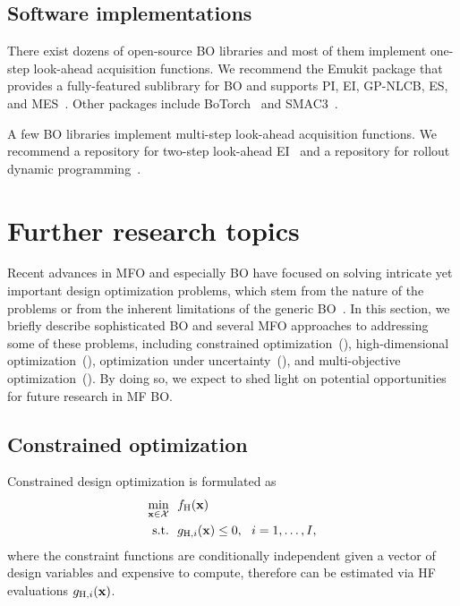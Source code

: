 \documentclass[iicol,sn-basic]{sn-jnl}%
\begin{document}
\subsection{Software implementations}\label{Sec55}

There exist dozens of open-source BO libraries and most of them implement one-step look-ahead acquisition functions.
We recommend the Emukit package that provides a fully-featured sublibrary for BO and supports PI, EI, GP-NLCB, ES, and MES~\citep{Paleyes2019}.
Other packages include BoTorch~\citep{Balandat2020} and SMAC3~\citep{Lindauer2022}.

A few BO libraries implement multi-step look-ahead acquisition functions. 
We recommend a repository for two-step look-ahead EI~\citep{WuJ2019} and a repository for rollout dynamic programming~\citep{Lee2020}.

\section{Further research topics}\label{Sec6}

Recent advances in MFO and especially BO have focused on solving intricate yet important design optimization problems, which stem from the nature of the problems or from the inherent limitations of the generic BO~\citep{Wang2023}.  
In this section, we briefly describe sophisticated BO and several MFO approaches to addressing some of these problems, including constrained optimization~(), high-dimensional optimization~(), optimization under uncertainty~(), and multi-objective optimization~().
By doing so, we expect to shed light on potential opportunities for future research in MF BO.

\subsection{Constrained optimization}\label{Sec61}

Constrained design optimization is formulated as
\begin{equation}\label{Eq61}
	\begin{aligned}
		\underset{{\bf x} \in \mathcal{X}}{\min} \ \ & f_\text{H}(\bf x)\\
		\textrm{s.t.} \ \ 
		& g_{\text{H},i}({\bf x}) \leq 0,\ \ i=1,\dots,I, 
	\end{aligned}
\end{equation}
where the constraint functions are conditionally independent given a vector of design variables and expensive to compute, therefore can be estimated via HF evaluations $g_{\text{H},i}({\bf x})$.
\end{document}
